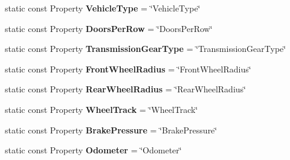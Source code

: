 \begin{DoxyCompactItemize}
\item 
\hypertarget{classVehicleProperty_a5f6f4c19869a4d6307a38bbcb14f3325}{static const Property {\bfseries Vehicle\-Type} = \char`\"{}Vehicle\-Type\char`\"{}}\label{classVehicleProperty_a5f6f4c19869a4d6307a38bbcb14f3325}

\item 
\hypertarget{classVehicleProperty_a0818b919a2721ebc9242fe4fd62c1c06}{static const Property {\bfseries Doors\-Per\-Row} = \char`\"{}Doors\-Per\-Row\char`\"{}}\label{classVehicleProperty_a0818b919a2721ebc9242fe4fd62c1c06}

\item 
\hypertarget{classVehicleProperty_a1255b40637cabbcc28901a9ca5efce8c}{static const Property {\bfseries Transmission\-Gear\-Type} = \char`\"{}Transmission\-Gear\-Type\char`\"{}}\label{classVehicleProperty_a1255b40637cabbcc28901a9ca5efce8c}

\item 
\hypertarget{classVehicleProperty_a61603d2610548667c65b21e2e5dc146b}{static const Property {\bfseries Front\-Wheel\-Radius} = \char`\"{}Front\-Wheel\-Radius\char`\"{}}\label{classVehicleProperty_a61603d2610548667c65b21e2e5dc146b}

\item 
\hypertarget{classVehicleProperty_a7317a413f21ad1c44667ada3883be9e6}{static const Property {\bfseries Rear\-Wheel\-Radius} = \char`\"{}Rear\-Wheel\-Radius\char`\"{}}\label{classVehicleProperty_a7317a413f21ad1c44667ada3883be9e6}

\item 
\hypertarget{classVehicleProperty_a02d72875c252d2763a40b6b0eb5dbe75}{static const Property {\bfseries Wheel\-Track} = \char`\"{}Wheel\-Track\char`\"{}}\label{classVehicleProperty_a02d72875c252d2763a40b6b0eb5dbe75}

\item 
\hypertarget{classVehicleProperty_a4e7d3a126e0055cf51cac18598fdf845}{static const Property {\bfseries Brake\-Pressure} = \char`\"{}Brake\-Pressure\char`\"{}}\label{classVehicleProperty_a4e7d3a126e0055cf51cac18598fdf845}

\item 
\hypertarget{classVehicleProperty_ad97147489a5be3babe1bb94dbb2cf970}{static const Property {\bfseries Odometer} = \char`\"{}Odometer\char`\"{}}\label{classVehicleProperty_ad97147489a5be3babe1bb94dbb2cf970}


\end{DoxyCompactItemize}
